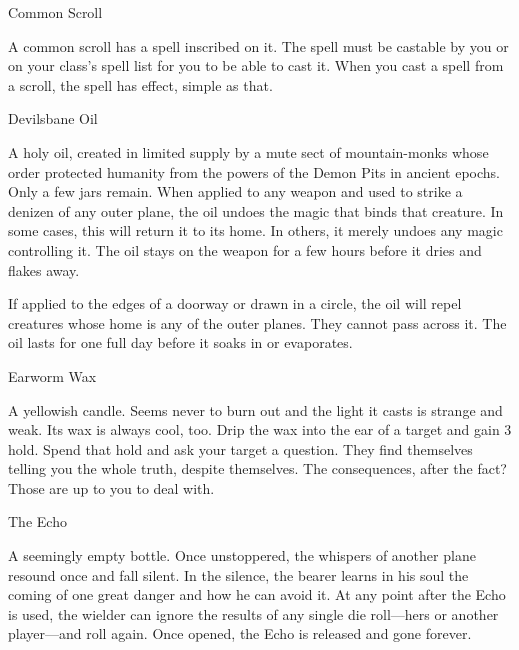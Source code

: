  

Common Scroll	 

 

A common scroll has a spell inscribed on it. The spell must be castable by you or on your class's spell list for you to be able to cast it. When you cast a spell from a scroll, the spell has effect, simple as that.

 

Devilsbane Oil	 

 

A holy oil, created in limited supply by a mute sect of mountain-monks whose order protected humanity from the powers of the Demon Pits in ancient epochs. Only a few jars remain. When applied to any weapon and used to strike a denizen of any outer plane, the oil undoes the magic that binds that creature. In some cases, this will return it to its home. In others, it merely undoes any magic controlling it. The oil stays on the weapon for a few hours before it dries and flakes away.

 

If applied to the edges of a doorway or drawn in a circle, the oil will repel creatures whose home is any of the outer planes. They cannot pass across it. The oil lasts for one full day before it soaks in or evaporates.

 

Earworm Wax	 

 

A yellowish candle. Seems never to burn out and the light it casts is strange and weak. Its wax is always cool, too. Drip the wax into the ear of a target and gain 3 hold. Spend that hold and ask your target a question. They find themselves telling you the whole truth, despite themselves. The consequences, after the fact? Those are up to you to deal with.

 

The Echo	 

 

A seemingly empty bottle. Once unstoppered, the whispers of another plane resound once and fall silent. In the silence, the bearer learns in his soul the coming of one great danger and how he can avoid it. At any point after the Echo is used, the wielder can ignore the results of any single die roll—hers or another player—and roll again. Once opened, the Echo is released and gone forever.

 


